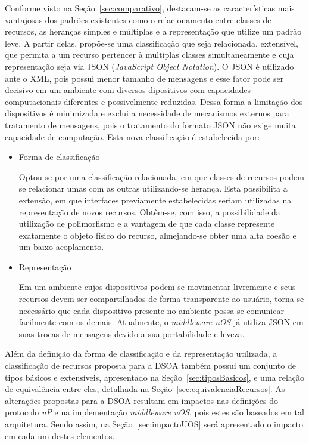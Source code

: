 Conforme visto na Seção~\ref{sec:comparativo}, destacam-se as características mais vantajosas dos padrões existentes como o relacionamento entre classes de recursos, as heranças simples e múltiplas e a representação que utilize um padrão leve. A partir delas, propõe-se uma classificação que seja relacionada, extensível, que permita a um recurso pertencer à multiplas classes simultaneamente e cuja representação seja via JSON (\emph{JavaScript Object Notation}). O JSON é utilizado ante o XML, pois possui menor tamanho de mensagens e esse fator pode ser decisivo em um ambiente com diversos dipositivos com capacidades computacionais diferentes e possivelmente reduzidas. Dessa forma a limitação dos dispositivos é minimizada e exclui a necessidade de mecanismos externos para tratamento de mensagens, pois o tratamento do formato JSON não exige muita capacidade de computação. Esta nova classificação é estabelecida por:

\begin{itemize}
	\item Forma de classificação

	Optou-se por uma classificação relacionada, em que classes de recursos podem se relacionar umas com as outras utilizando-se herança. Esta possibilita a extensão, em que interfaces previamente estabelecidas seriam utilizadas na representação de novos recursos. Obtêm-se, com isso, a possibilidade da utilização de polimorfismo e a vantagem de que cada classe represente exatamente o objeto físico do recurso, almejando-se obter uma alta coesão e um baixo acoplamento.

	\item Representação

	Em um ambiente cujos dispositivos podem se movimentar livremente e seus recursos devem ser compartilhados de forma transparente ao usuário, torna-se necessário que cada dispositivo presente no ambiente possa se comunicar facilmente com os demais. Atualmente, o \emph{middleware uOS} já utiliza JSON em suas trocas de mensagens devido a sua portabilidade e leveza.
\end{itemize}

Além da definição da forma de classificação e da representação utilizada, a classificação de recursos proposta para a DSOA também possui um conjunto de tipos básicos e extensíveis, apresentado na Seção~\ref{sec:tiposBasicos}, e uma relação de equivalência entre eles, detalhada na Seção~\ref{sec:equivalenciaRecursos}. As alterações propostas para a DSOA resultam em impactos nas definições do protocolo \emph{uP} e na implementação \emph{middleware uOS}, pois estes são baseados em tal arquitetura. Sendo assim, na Seção~\ref{sec:impactoUOS} será apresentado o impacto em cada um destes elementos.

